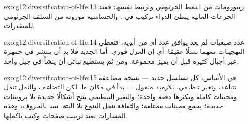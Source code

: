 \begin{solution}{exo:g12:diversification-of-life:13}
ريبوزومات  من النمط الجرثومي وترتبط  نفسها:
فعند الجرعات العالية يبطئ الدواء تركيب  في .
والحساسية موروثة من السلف الجرثومي للمتقدرات.
\end{solution}

\begin{solution}{exo:g12:diversification-of-life:14}
عدد صبغيات  لم يعد يوافق عدد أي من أبويه، فتعطي
التهجينات معهما نسلًا عقيمًا: أي إن العزل فوري. أما  الجديد فلا
بد أن ينتشر في جمهرة عبر أجيال كثيرة قبل أن يميز مجموعة. ومن ثم يستطيع
 نباتي أن ينشأ في جيل واحد.
\end{solution}

\begin{solution}{exo:g12:diversification-of-life:15}
في الأساس، كل تسلسل جديد --- نسخة مضاعفة تتباعد، وتغير تنظيمي،
 بلازميد منقول --- بدأ  في مكان ما. لكن التضاعف والنقل
 تنقل  ومجينات كاملة وتكثرها دفعة واحدة؛
والتغير التنظيمي ينتج أشكالًا جديدة بلا بروتينات جديدة؛  يجمع
مجينات  مختلفة؛ والثقافة تنقل التنوع بلا  البتة. 
تمد بالحروف، وهذه المسارات تعيد ترتيب صفحات وكتب بأكملها.
\end{solution}

